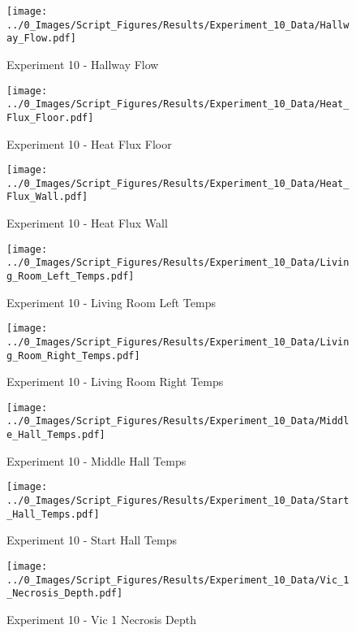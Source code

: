 	\clearpage

	\begin{figure}[H]
		\centering
		\texttt{[image: ../0\_Images/Script\_Figures/Results/Experiment\_10\_Data/Hallway\_Flow.pdf]}
		\caption[]{Experiment 10 - Hallway Flow}
	\end{figure}
 

	\begin{figure}[H]
		\centering
		\texttt{[image: ../0\_Images/Script\_Figures/Results/Experiment\_10\_Data/Heat\_Flux\_Floor.pdf]}
		\caption[]{Experiment 10 - Heat Flux Floor}
	\end{figure}
 
	\clearpage

	\begin{figure}[H]
		\centering
		\texttt{[image: ../0\_Images/Script\_Figures/Results/Experiment\_10\_Data/Heat\_Flux\_Wall.pdf]}
		\caption[]{Experiment 10 - Heat Flux Wall}
	\end{figure}
 

	\begin{figure}[H]
		\centering
		\texttt{[image: ../0\_Images/Script\_Figures/Results/Experiment\_10\_Data/Living\_Room\_Left\_Temps.pdf]}
		\caption[]{Experiment 10 - Living Room Left Temps}
	\end{figure}
 
	\clearpage

	\begin{figure}[H]
		\centering
		\texttt{[image: ../0\_Images/Script\_Figures/Results/Experiment\_10\_Data/Living\_Room\_Right\_Temps.pdf]}
		\caption[]{Experiment 10 - Living Room Right Temps}
	\end{figure}
 

	\begin{figure}[H]
		\centering
		\texttt{[image: ../0\_Images/Script\_Figures/Results/Experiment\_10\_Data/Middle\_Hall\_Temps.pdf]}
		\caption[]{Experiment 10 - Middle Hall Temps}
	\end{figure}
 
	\clearpage

	\begin{figure}[H]
		\centering
		\texttt{[image: ../0\_Images/Script\_Figures/Results/Experiment\_10\_Data/Start\_Hall\_Temps.pdf]}
		\caption[]{Experiment 10 - Start Hall Temps}
	\end{figure}
 

	\begin{figure}[H]
		\centering
		\texttt{[image: ../0\_Images/Script\_Figures/Results/Experiment\_10\_Data/Vic\_1\_Necrosis\_Depth.pdf]}
		\caption[]{Experiment 10 - Vic 1 Necrosis Depth}
	\end{figure}
 
